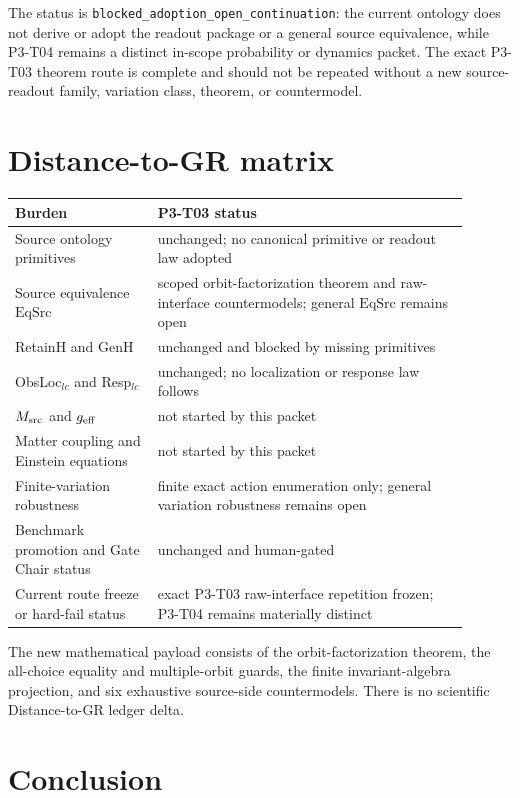 \documentclass[11pt]{article}
\theoremstyle{definition}
\newcommand{\EqSrc}{\ensuremath{\mathrm{EqSrc}}}
\begin{document}
The status is \texttt{blocked\_adoption\_open\_continuation}: the current
ontology does not derive or adopt the readout package or a general source
equivalence, while P3-T04 remains a distinct in-scope probability or dynamics
packet.  The exact P3-T03 theorem route is complete and should not be repeated
without a new source-readout family, variation class, theorem, or countermodel.

\section{Distance-to-GR matrix}

\begin{longtable}{>{\raggedright\arraybackslash}p{0.29\linewidth}
                  >{\raggedright\arraybackslash}p{0.61\linewidth}}
\toprule
Burden & P3-T03 status\\
\midrule
\endhead
Source ontology primitives & unchanged; no canonical primitive or readout law adopted\\
Source equivalence \EqSrc{} & scoped orbit-factorization theorem and raw-interface countermodels; general \EqSrc{} remains open\\
RetainH and GenH & unchanged and blocked by missing primitives\\
ObsLoc$_{lc}$ and Resp$_{lc}$ & unchanged; no localization or response law follows\\
$M_{\rm src}$ and $g_{\rm eff}$ & not started by this packet\\
Matter coupling and Einstein equations & not started by this packet\\
Finite-variation robustness & finite exact action enumeration only; general variation robustness remains open\\
Benchmark promotion and Gate Chair status & unchanged and human-gated\\
Current route freeze or hard-fail status & exact P3-T03 raw-interface repetition frozen; P3-T04 remains materially distinct\\
\bottomrule
\end{longtable}

The new mathematical payload consists of the orbit-factorization theorem, the
all-choice equality and multiple-orbit guards, the finite invariant-algebra
projection, and six exhaustive source-side countermodels.  There is no
scientific Distance-to-GR ledger delta.

\section{Conclusion}
\end{document}
